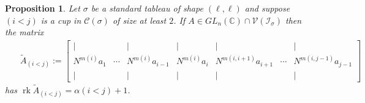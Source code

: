 \documentclass[11pt]{amsart}
\newtheorem{prop}[theorem]{Proposition}
\theoremstyle{remark}
\theoremstyle{remark}
\theoremstyle{definition}
\theoremstyle{definition}
\theoremstyle{definition}
\numberwithin{equation}{section}
\newcommand{\C}{\mathbb{C}}           %
\newcommand{\rk}{\operatorname{rk}}
\newcommand{\gs}{\sigma}
\newcommand{\cc}{\mathcal{C}}
\newcommand{\ci}{\mathcal{I}}
\newcommand{\cv}{\mathcal{V}}
\newcommand{\al}{\alpha}
\newcommand{\m}[2]{m(#1,#2)}
\newcommand{\mi}[1]{m(#1)}
\begin{document}
\begin{prop}\label{prop.aug.rank} Let $\gs$ be a standard tableau of shape $(\ell, \ell)$ and suppose $(i<j)$ is a cup in $\cc(\gs)$ of size at least $2$. If $A\in GL_n(\C)\cap\cv(\ci_\gs)$ then the matrix
\begin{eqnarray}\label{eqn.extmatrix}
\;\;\;\;\;\widetilde{A}_{(i<j)} :=  \begin{bmatrix} | &  & | & | & | &  & |  \\ N^{\mi{i}}a_1 & \cdots & N^{\mi{i}}a_{i-1} & N^{\mi{i}}a_i & N^{\m{i}{i+1}}a_{i+1} & \cdots & N^{\m{i}{j-1}}a_{j-1} \\| &   & | & | & | & &|  \end{bmatrix}
\end{eqnarray}
has $\rk \widetilde{A}_{(i<j)} =\al(i<j)+1$. 
\end{prop}
\end{document}

